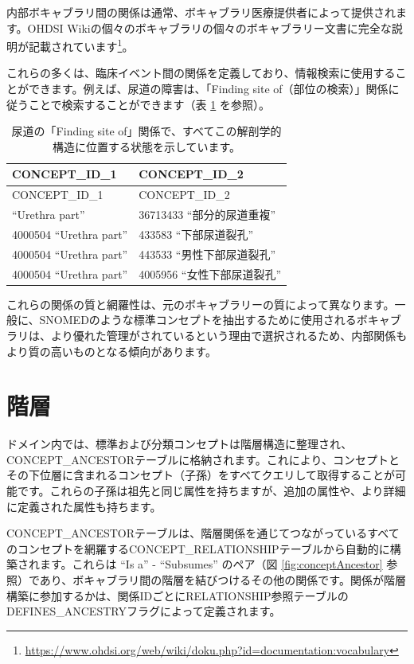 \documentclass[
  11pt]{book}
\theoremstyle{definition}
\theoremstyle{definition}
\theoremstyle{definition}
\theoremstyle{definition}
\theoremstyle{remark}
\begin{document}
内部ボキャブラリ間の関係は通常、ボキャブラリ医療提供者によって提供されます。OHDSI Wikiの個々のボキャブラリの個々のボキャブラリー文書に完全な説明が記載されています\footnote{\url{https://www.ohdsi.org/web/wiki/doku.php?id=documentation:vocabulary}}。

これらの多くは、臨床イベント間の関係を定義しており、情報検索に使用することができます。例えば、尿道の障害は、「Finding site of（部位の検索）」関係に従うことで検索することができます（表 \ref{tab:findingSite} を参照）。

\begin{longtable}[]{@{}ll@{}}
\caption{\label{tab:findingSite} 尿道の「Finding site of」関係で、すべてこの解剖学的構造に位置する状態を示しています。}\tabularnewline
\toprule\noalign{}
CONCEPT\_ID\_1 & CONCEPT\_ID\_2 \\
\midrule\noalign{}
\endfirsthead
\toprule\noalign{}
CONCEPT\_ID\_1 & CONCEPT\_ID\_2 \\
\midrule\noalign{}
\endhead
\bottomrule\noalign{}
\endlastfoot
4000504 ``Urethra part'' & 36713433 ``部分的尿道重複'' \\
4000504 ``Urethra part'' & 433583 ``下部尿道裂孔'' \\
4000504 ``Urethra part'' & 443533 ``男性下部尿道裂孔'' \\
4000504 ``Urethra part'' & 4005956 ``女性下部尿道裂孔'' \\
\end{longtable}

これらの関係の質と網羅性は、元のボキャブラリーの質によって異なります。一般に、SNOMEDのような標準コンセプトを抽出するために使用されるボキャブラリは、より優れた管理がされているという理由で選択されるため、内部関係もより質の高いものとなる傾向があります。

\section{階層}\label{conceptAncestor}

ドメイン内では、標準および分類コンセプトは階層構造に整理され、CONCEPT\_ANCESTORテーブルに格納されます。これにより、コンセプトとその下位層に含まれるコンセプト（子孫）をすべてクエリして取得することが可能です。これらの子孫は祖先と同じ属性を持ちますが、追加の属性や、より詳細に定義された属性も持ちます。

CONCEPT\_ANCESTORテーブルは、階層関係を通じてつながっているすべてのコンセプトを網羅するCONCEPT\_RELATIONSHIPテーブルから自動的に構築されます。これらは ``Is a'' - ``Subsumes'' のペア（図 \ref{fig:conceptAncestor} 参照）であり、ボキャブラリ間の階層を結びつけるその他の関係です。関係が階層構築に参加するかは、関係IDごとにRELATIONSHIP参照テーブルのDEFINES\_ANCESTRYフラグによって定義されます。
\end{document}
